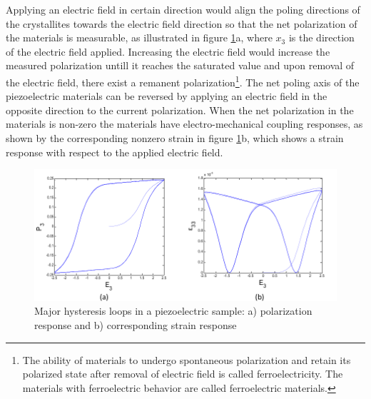 Applying an electric field in certain direction would align the poling directions of the crystallites towards the electric field direction so that the net polarization of the materials is measurable,
 as illustrated in figure \ref{fig:Majorhysteresisloops}a, where $x_3$ is the direction of the electric field applied. 
Increasing the electric field would increase the measured polarization untill it
reaches the saturated value and upon removal of the electric field, there exist a remanent polarization\footnote{The ability of materials to undergo spontaneous polarization and retain its polarized state after removal of electric field is called ferroelectricity. The materials with ferroelectric behavior are called ferroelectric materials.}. The net poling axis of the piezoelectric materials can be reversed by applying an electric field in the opposite direction to the current polarization. When the net polarization in the materials is non-zero the materials have electro-mechanical coupling responses,
 as shown by the corresponding nonzero strain in figure \ref{fig:Majorhysteresisloops}b, which shows a strain response with respect to the applied electric field.

\begin{figure}
\centering
\includegraphics[width=6in]{./chap_2_pol_sw/figures/majorloop_polarization_switching.pdf}
\caption{Major hysteresis loops in a piezoelectric sample: a) polarization response and b) corresponding strain response}
\label{fig:Majorhysteresisloops}
\end{figure} 

